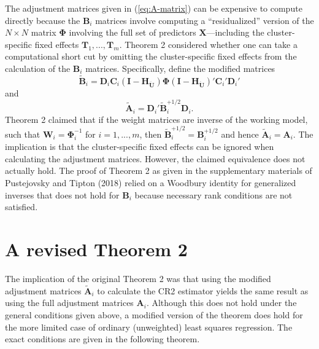 \documentclass[12pt]{article}
\begin{document}
The adjustment matrices given in (\ref{eq:A-matrix}) can be expensive to
compute directly because the \(\mathbf{B}_i\) matrices involve computing
a ``residualized'' version of the \(N \times N\) matrix
\(\boldsymbol\Phi\) involving the full set of predictors
\(\mathbf{X}\)---including the cluster-specific fixed effects
\(\mathbf{T}_1,...,\mathbf{T}_m\). Theorem 2 considered whether one can
take a computational short cut by omitting the cluster-specific fixed
effects from the calculation of the \(\mathbf{B}_i\) matrices.
Specifically, define the modified matrices \begin{equation}
\label{eq:B-modified}
\mathbf{\tilde{B}}_i = \mathbf{D}_i \mathbf{C}_i \left(\mathbf{I} - \mathbf{H}_{\mathbf{\ddot{U}}}\right) \boldsymbol\Phi \left(\mathbf{I} - \mathbf{H}_{\mathbf{\ddot{U}}}\right)'\mathbf{C}_i' \mathbf{D}_i'
\end{equation} and \begin{equation}
\label{eq:A-modified}
\mathbf{\tilde{A}}_i = \mathbf{D}_i' \mathbf{\tilde{B}}_i^{+1/2} \mathbf{D}_i.
\end{equation} Theorem 2 claimed that if the weight matrices are inverse
of the working model, such that
\(\mathbf{W}_i = \boldsymbol\Phi_i^{-1}\) for \(i = 1,...,m\), then
\(\mathbf{\tilde{B}}_i^{+1/2} = \mathbf{B}_i^{+1/2}\) and hence
\(\mathbf{\tilde{A}}_i = \mathbf{A}_i\). The implication is that the
cluster-specific fixed effects can be ignored when calculating the
adjustment matrices. However, the claimed equivalence does not actually
hold. The proof of Theorem 2 as given in the supplementary materials of
Pustejovsky and Tipton (2018) relied on a Woodbury identity for
generalized inverses that does not hold for \(\mathbf{B}_i\) because
necessary rank conditions are not satisfied.

\hypertarget{a-revised-theorem-2}{%
\section{A revised Theorem 2}\label{a-revised-theorem-2}}

The implication of the original Theorem 2 was that using the modified
adjustment matrices \(\tilde{\mathbf{A}}_i\) to calculate the CR2
estimator yields the same result as using the full adjustment matrices
\(\mathbf{A}_i\). Although this does not hold under the general
conditions given above, a modified version of the theorem does hold for
the more limited case of ordinary (unweighted) least squares regression.
The exact conditions are given in the following theorem.
\end{document}
